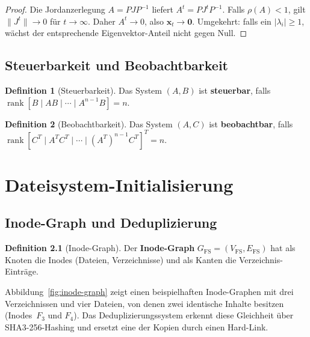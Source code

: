 ﻿\documentclass[a4paper,12pt]{scrreprt}
\theoremstyle{definition}
\newtheorem{definition}{Definition}[chapter]
\DeclareMathOperator{\rank}{rank}
\begin{document}
	\begin{proof}
		Die Jordanzerlegung $A = P J P^{-1}$ liefert $A^t = P J^t P^{-1}$.
		Falls $\rho(A) < 1$, gilt $\|J^t\| \to 0$ für $t \to \infty$.
		Daher $A^t \to 0$, also $\mathbf{x}_t \to \mathbf{0}$.
		Umgekehrt: falls ein $|\lambda_i| \geq 1$, wächst der entsprechende
		Eigenvektor-Anteil nicht gegen Null.
	\end{proof}
	
	\section{Steuerbarkeit und Beobachtbarkeit}
	
	\begin{definition}[Steuerbarkeit]
		Das System $(A, B)$ ist \textbf{steuerbar}, falls
		$\rank[B \mid AB \mid \cdots \mid A^{n-1}B] = n$.
	\end{definition}
	
	\begin{definition}[Beobachtbarkeit]
		Das System $(A, C)$ ist \textbf{beobachtbar}, falls
		$\rank[C^T \mid A^T C^T \mid \cdots \mid (A^T)^{n-1}C^T]^T = n$.
	\end{definition}
	
	\chapter{Dateisystem-Initialisierung}
	
	\section{Inode-Graph und Deduplizierung}

	\begin{definition}[Inode-Graph]
		Der \textbf{Inode-Graph} $G_{\mathrm{FS}} = (V_{\mathrm{FS}}, E_{\mathrm{FS}})$
		hat als Knoten die Inodes (Dateien, Verzeichnisse) und als Kanten
		die Verzeichnis-Einträge.
	\end{definition}

	Abbildung~\ref{fig:inode-graph} zeigt einen beispielhaften Inode-Graphen
	mit drei Verzeichnissen und vier Dateien, von denen zwei identische
	Inhalte besitzen (Inodes~$F_3$ und $F_4$). Das Deduplizierungssystem
	erkennt diese Gleichheit über SHA3-256-Hashing und ersetzt eine der
	Kopien durch einen Hard-Link.
\end{document}
